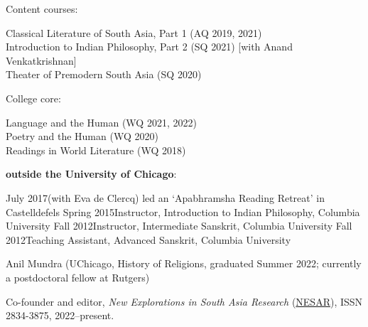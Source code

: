 \documentclass{scrartcl}
\begin{document}
\quad\begin{minipage}{0.9\textwidth}
Content courses:\vspace{1ex}

\quad\begin{minipage}{0.9\textwidth}
Classical Literature of South Asia, Part 1 (AQ 2019, 2021)\\[.5ex]
Introduction to Indian Philosophy, Part 2 (SQ 2021) [with Anand Venkatkrishnan]\\[.5ex]
Theater of Premodern South Asia (SQ 2020)
\end{minipage}
\end{minipage}\medskip

\quad\begin{minipage}{0.9\textwidth}
College core:\vspace{1ex}

\quad\begin{minipage}{0.9\textwidth}
Language and the Human (WQ 2021, 2022)\\[.5ex]
Poetry and the Human (WQ 2020)\\[.5ex]
Readings in World Literature (WQ 2018)
\end{minipage}
\end{minipage}\medskip\medskip

\textbf{outside the University of Chicago}:

\begin{entrylist}
\singleentry
{July 2017}{(with Eva de Clercq) led an ‘Apabhramsha Reading Retreat’ in Castelldefels}
\singleentry
{Spring 2015}{Instructor, Introduction to Indian Philosophy, Columbia University}
\singleentry
{Fall 2012}{Instructor, Intermediate Sanskrit, Columbia University}
\singleentry
{Fall 2012}{Teaching Assistant, Advanced Sanskrit, Columbia University}
\end{entrylist} 


Anil Mundra (UChicago, History of Religions, graduated Summer 2022; currently a postdoctoral fellow at Rutgers)\bigskip


Co-founder and editor, \emph{New Explorations in South Asia Research} (\href{https://nesarjournal.org}{NESAR}), ISSN 2834-3875, 2022–present.\smallskip

\vfill
\end{document}
